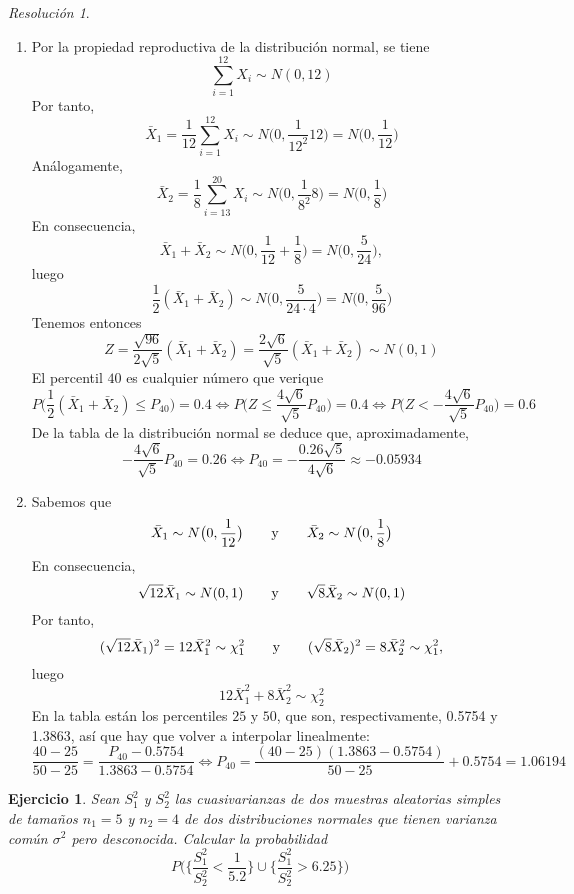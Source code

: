 \documentclass[11pt]{report}
\newtheorem{exercise}{Ejercicio}
\theoremstyle{remark}
\newtheorem*{resolution}{Resolución}
\begin{document}
\begin{resolution}
\hfill
\begin{enumerate}
    \item Por la propiedad reproductiva de la distribución normal, se tiene
    \[\sum_{i=1}^{12} X_i \sim N(0,12)\]
    Por tanto,
    \[\bar{X}_1 = \frac{1}{12}\sum_{i=1}^{12} X_i \sim N\bigl(0,\frac{1}{12^2}12\bigr) = N\bigl(0,\frac{1}{12}\bigr)\]
    Análogamente,
    \[\bar{X}_2 = \frac{1}{8}\sum_{i=13}^{20} X_i \sim N\bigl(0,\frac{1}{8^2}8\bigr) = N\bigl(0,\frac{1}{8}\bigr)\]
    En consecuencia,
    \[\bar{X}_1+\bar{X}_2 \sim N\bigl(0,\frac{1}{12}+\frac{1}{8}\bigr) = N\bigl(0,\frac{5}{24}\bigr),\]
    luego
    \[\frac{1}{2}(\bar{X}_1+\bar{X}_2) \sim N\bigl(0,\frac{5}{24 \cdot 4}\bigr) = N\bigl(0,\frac{5}{96}\bigr)\]
    Tenemos entonces
    \[Z = \frac{\sqrt{96}}{2\sqrt{5}}(\bar{X}_1+\bar{X}_2) = \frac{2\sqrt{6}}{\sqrt{5}}(\bar{X}_1+\bar{X}_2) \sim N(0,1)\]
    El percentil $40$ es cualquier número que verique
    \[P\bigl(\frac{1}{2}(\bar{X}_1+\bar{X}_2) \leq P_{40}\bigr) = 0.4 \iff P\bigl(Z \leq \frac{4\sqrt{6}}{\sqrt{5}}P_{40}\bigr) = 0.4 \iff P\bigl(Z<-\frac{4\sqrt{6}}{\sqrt{5}}P_{40}\bigr) =0.6\]
    De la tabla de la distribución normal se deduce que, aproximadamente,
    \[-\frac{4\sqrt{6}}{\sqrt{5}} P_{40}= 0.26 \iff P_{40} = -\frac{0.26\sqrt{5}}{4\sqrt{6}} \approx -0.05934\]
    \item Sabemos que
    \[\bar{X}_1 \sim N\bigl(0,\frac{1}{12}\bigr) \qquad \textup{y} \qquad \bar{X}_2 \sim N\bigl(0,\frac{1}{8}\bigr)\]
    En consecuencia,
    \[\sqrt{12}\bar{X}_1 \sim N(0,1) \qquad \textup{y} \qquad \sqrt{8}\bar{X}_2 \sim N(0,1)\]
    Por tanto,
    \[(\sqrt{12}\bar{X}_1)^2 = 12\bar{X}_1^2 \sim \chi^2_1 \qquad \textup{y} \qquad (\sqrt{8}\bar{X}_2)^2 = 8\bar{X}_2^2 \sim \chi^2_1,\]
    luego
    \[12\bar{X}_1^2+8\bar{X}_2^2 \sim \chi^2_2\]
    En la tabla están los percentiles $25$ y $50$, que son, respectivamente, 0.5754 y 1.3863, así que hay que volver a interpolar linealmente:
    \[\frac{40-25}{50-25} = \frac{P_{40}-0.5754}{1.3863-0.5754} \iff P_{40} = \frac{(40-25)(1.3863-0.5754)}{50-25}+0.5754 = 1.06194\]
\end{enumerate}
\end{resolution}

\begin{exercise}
Sean $S^2_1$ y $S^2_2$ las cuasivarianzas de dos muestras aleatorias simples de tamaños $n_1=5$ y $n_2=4$ de dos distribuciones normales que tienen varianza común $\sigma^2$ pero desconocida. Calcular la probabilidad
\[P\bigl(\bigl\{\frac{S^2_1}{S^2_2}<\frac{1}{5.2}\bigr\} \cup\bigl\{\frac{S^2_1}{S^2_2}>6.25\bigr\}\bigr)\]
\end{exercise}
\end{document}
